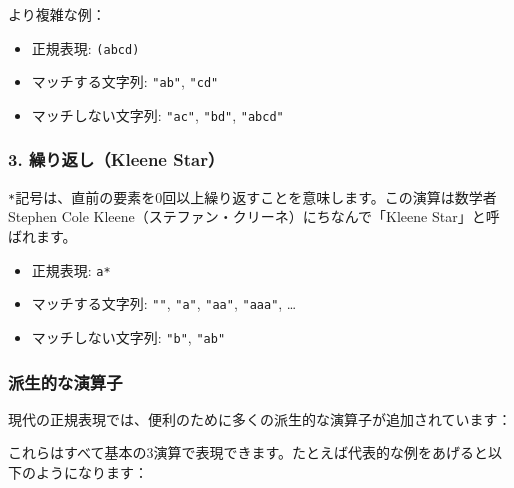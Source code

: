 より複雑な例：

\begin{itemize}
\tightlist
\item
  正規表現: \texttt{(ab\textbar{}cd)}
\item
  マッチする文字列: \texttt{"ab"}, \texttt{"cd"}
\item
  マッチしない文字列: \texttt{"ac"}, \texttt{"bd"}, \texttt{"abcd"}
\end{itemize}

\hypertarget{chapter4-ux7e70ux308aux8fd4ux3057kleene-star}{%
\subsubsection{3. 繰り返し（Kleene
Star）}\label{chapter4-ux7e70ux308aux8fd4ux3057kleene-star}}

\texttt{*}記号は、直前の要素を0回以上繰り返すことを意味します。この演算は数学者Stephen
Cole Kleene（ステファン・クリーネ）にちなんで「Kleene
Star」と呼ばれます。

\begin{itemize}
\tightlist
\item
  正規表現: \texttt{a*}
\item
  マッチする文字列: \texttt{""}, \texttt{"a"}, \texttt{"aa"},
  \texttt{"aaa"}, \ldots{}
\item
  マッチしない文字列: \texttt{"b"}, \texttt{"ab"}
\end{itemize}

\hypertarget{chapter4-ux6d3eux751fux7684ux306aux6f14ux7b97ux5b50}{%
\subsubsection{派生的な演算子}\label{chapter4-ux6d3eux751fux7684ux306aux6f14ux7b97ux5b50}}

現代の正規表現では、便利のために多くの派生的な演算子が追加されています：

\begin{Shaded}
\begin{Highlighting}[]
\end{Highlighting}
\end{Shaded}

これらはすべて基本の3演算で表現できます。たとえば代表的な例をあげると以下のようになります：

